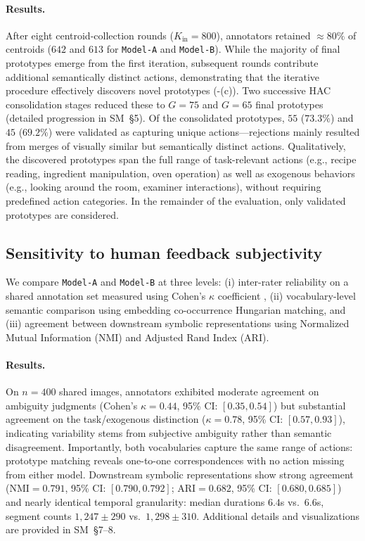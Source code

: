 \documentclass[runningheads]{llncs}
\begin{document}
    \paragraph{Results.} After eight centroid-collection rounds ($K_{\text{in}}=800$), annotators retained $\approx 80\%$ of centroids ($642$ and $613$ for \texttt{Model-A} and \texttt{Model-B}). While the majority of final prototypes emerge from the first iteration, subsequent rounds contribute additional semantically distinct actions, demonstrating that the iterative procedure effectively discovers novel prototypes (-(c)). Two successive HAC consolidation stages reduced these to $G=75$ and $G=65$ final prototypes (detailed progression in SM~\S5). Of the consolidated prototypes, $55$ ($73.3\%$) and $45$ ($69.2\%$) were validated as capturing unique actions---rejections mainly resulted from merges of visually similar but semantically distinct actions. Qualitatively, the discovered prototypes span the full range of task-relevant actions (e.g., recipe reading, ingredient manipulation, oven operation) as well as exogenous behaviors (e.g., looking around the room, examiner interactions), without requiring predefined action categories. In the remainder of the evaluation, only validated prototypes are considered.

    \subsection{Sensitivity to human feedback subjectivity}

    We compare \texttt{Model-A} and \texttt{Model-B} at three levels: (i) inter-rater reliability on a shared annotation set measured using Cohen's $\kappa$ coefficient \citep{cohen1960}, (ii) vocabulary-level semantic comparison using embedding co-occurrence Hungarian matching, and (iii) agreement between downstream symbolic representations using Normalized Mutual Information (NMI) and Adjusted Rand Index (ARI).

    \paragraph{Results.} On $n=400$ shared images, annotators exhibited moderate agreement on ambiguity judgments (Cohen's $\kappa=0.44$, 95\% CI: $[0.35, 0.54]$) but substantial agreement on the task/exogenous distinction ($\kappa=0.78$, 95\% CI: $[0.57, 0.93]$), indicating variability stems from subjective ambiguity rather than semantic disagreement. Importantly, both vocabularies capture the same range of actions: prototype matching reveals one-to-one correspondences with no action missing from either model. Downstream symbolic representations show strong agreement (NMI$=0.791$, 95\% CI: $[0.790, 0.792]$; ARI$=0.682$, 95\% CI: $[0.680, 0.685]$) and nearly identical temporal granularity: median durations $6.4$s vs.\ $6.6$s, segment counts $1{,}247\pm290$ vs.\ $1{,}298\pm310$. Additional details and visualizations are provided in SM~\S7--8.
\end{document}
